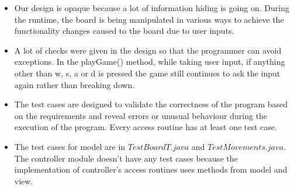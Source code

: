 \documentclass[12pt]{article}
\begin{document}
\begin{itemize}
    \item Our design is opaque because a lot of information hiding is going on. During the runtime, the board is being manipulated in various ways to achieve the functionality changes caused to the board due to user inputs.
    \item A lot of checks were given in the design so that the programmer can avoid exceptions. In the playGame() method, while taking user input, if anything other than w, s, a or d is pressed the game still continues to ask the input again rather than breaking down.
    \item The test cases are designed to validate the correctness of the program based on the requirements and reveal errors or unusual behaviour during the execution of the program. Every access routine has at least one test case. 
    \item The test cases for model are in $TestBoardT.java$ and $TestMovements.java$. The controller module doesn't have any test cases because the implementation of controller's access routines uses methods from model and view.
\end{itemize}
\end{document}
